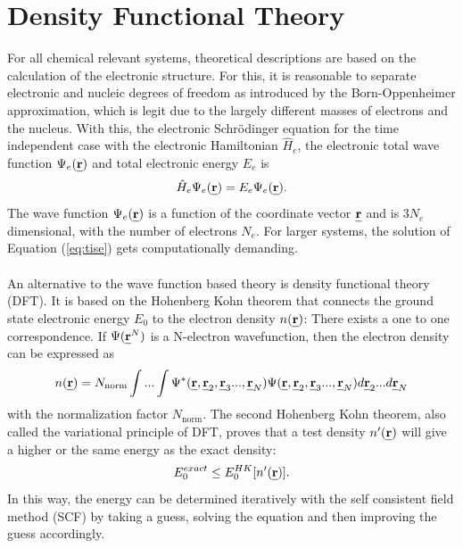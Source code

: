 \documentclass[11pt,DIV=13,BCOR=5mm,a4paper,headinclude]{scrbook}
\def\mathbi#1{\textbf{\em #1}}
\renewcommand{\vec}[1]{\mathbi{#1}}
\begin{document}
\section{Density Functional Theory}
For all chemical relevant systems, theoretical descriptions are based on the calculation of the electronic structure.
For this, it is reasonable to separate electronic and nucleic degrees of freedom as introduced by the Born-Oppenheimer approximation\cite{bornoppenheimer}, which is legit due to the largely different masses of electrons and the nucleus.
With this, the electronic Schrödinger equation for the time independent case  with the electronic Hamiltonian $\hat{H}_e$, the electronic total wave function $\Psi_e(\vec{r})$ and total electronic energy $E_e$ is
\begin{equation}\label{eq:tise}
 \hat{H}_e\Psi_e(\vec{r})=E_e\Psi_e(\vec{r}).
\end{equation}
The wave function $\Psi_e(\vec{r})$ is a function of the coordinate vector $\vec{r}$ and is 3$N_e$ dimensional, with the number of electrons $N_e$.
For larger systems, the solution of Equation (\ref{eq:tise}) gets computationally demanding.
\\\\
An alternative to the wave function based theory is density functional theory (DFT).
It is based on the Hohenberg Kohn theorem\cite{Hohenberg-Kohn1964} that connects the ground state electronic energy $E_0$ to the electron density $n(\vec{r})$: There exists a one to one correspondence.
If $\Psi(\vec{r}^N)$ is a N-electron wavefunction, then the  electron density can be expressed as
\begin{equation}\label{eq:electron-density}
 n(\vec{r})=N_\textrm{norm}\int ...
\int \Psi^\ast(\vec{r},\vec{r}_2,\vec{r}_3...,\vec{r}_N)\Psi(\vec{r},\vec{r}_2,\vec{r}_3...,\vec{r}_N) d \vec{r}_2...d \vec{r}_N
\end{equation}
with the normalization factor $N_\textrm{norm}$.
The second Hohenberg Kohn theorem, also called the variational principle of DFT, proves that a test density $n^\prime(\vec{r})$ will give a higher or the same energy as the exact density:
\begin{equation}
 E_0^{exact}\leq E_0^{HK}[n^\prime(\vec{r})].
\end{equation}
In this way, the energy can be determined iteratively with the self consistent field method (SCF) by taking a guess, solving the equation and then improving the guess accordingly.
\end{document}
